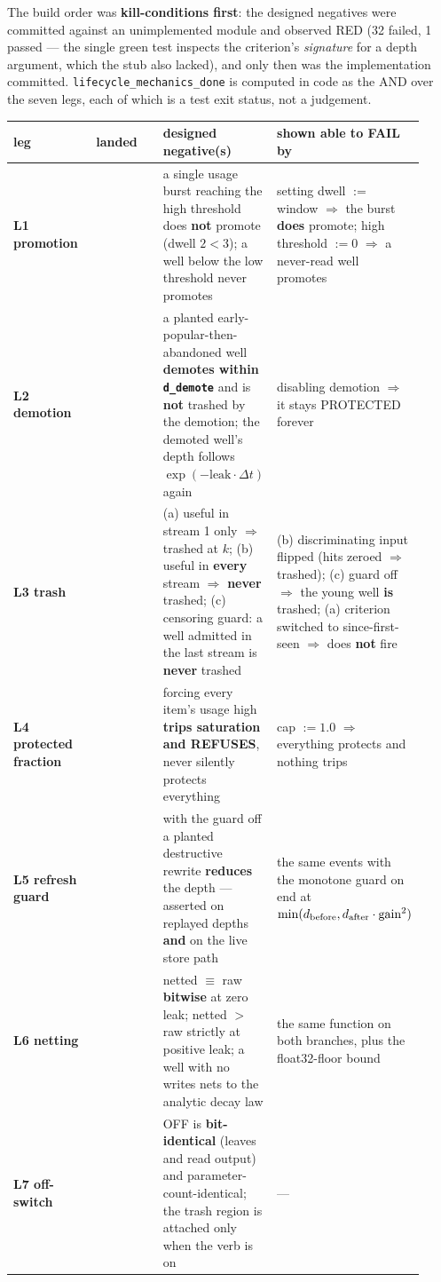\documentclass{article}
\begin{document}
The build order was \textbf{kill-conditions first}: the designed negatives were committed against an unimplemented module and observed RED (32 failed, 1 passed --- the single green test inspects the criterion's \emph{signature} for a depth argument, which the stub also lacked), and only then was the implementation committed. \texttt{lifecycle\_mechanics\_done} is computed in code as the AND over the seven legs, each of which is a test exit status, not a judgement.

\begin{table}[t]\centering\small
\begin{tabular}{p{0.23\linewidth}p{0.23\linewidth}p{0.23\linewidth}p{0.23\linewidth}}
\toprule
leg & landed & designed negative(s) & shown able to FAIL by \\
\midrule
\textbf{L1 promotion} &  & a single usage burst reaching the high threshold does \textbf{not} promote (dwell $2<3$); a well below the low threshold never promotes & setting dwell $:=$ window $\Rightarrow$ the burst \textbf{does} promote; high threshold $:=0$ $\Rightarrow$ a never-read well promotes \\
\textbf{L2 demotion} &  & a planted early-popular-then-abandoned well \textbf{demotes within \texttt{d\_demote}} and is \textbf{not} trashed by the demotion; the demoted well's depth follows $\exp(-\text{leak}\cdot\Delta t)$ again & disabling demotion $\Rightarrow$ it stays PROTECTED forever \\
\textbf{L3 trash} &  & (a) useful in stream 1 only $\Rightarrow$ trashed at $k$; (b) useful in \textbf{every} stream $\Rightarrow$ \textbf{never} trashed; (c) censoring guard: a well admitted in the last stream is \textbf{never} trashed & (b) discriminating input flipped (hits zeroed $\Rightarrow$ trashed); (c) guard off $\Rightarrow$ the young well \textbf{is} trashed; (a) criterion switched to since-first-seen $\Rightarrow$ does \textbf{not} fire \\
\textbf{L4 protected fraction} &  & forcing every item's usage high \textbf{trips saturation and REFUSES}, never silently protects everything & cap $:=1.0$ $\Rightarrow$ everything protects and nothing trips \\
\textbf{L5 refresh guard} &  & with the guard off a planted destructive rewrite \textbf{reduces} the depth --- asserted on replayed depths \textbf{and} on the live store path & the same events with the monotone guard on end at $\min(d_{\rm before}, d_{\rm after}\cdot\text{gain}^2)$ \\
\textbf{L6 netting} &  & netted $\equiv$ raw \textbf{bitwise} at zero leak; netted $>$ raw strictly at positive leak; a well with no writes nets to the analytic decay law & the same function on both branches, plus the float32-floor bound \\
\textbf{L7 off-switch} &  & OFF is \textbf{bit-identical} (leaves and read output) and parameter-count-identical; the trash region is attached only when the verb is on & --- \\
\bottomrule
\end{tabular}
\end{table}
\end{document}
